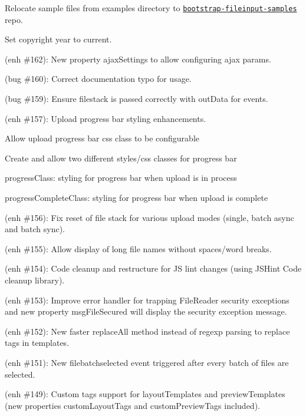 \begin{DoxyItemize}
\item Relocate sample files from examples directory to \href{https://github.com/kartik-v/bootstrap-fileinput-samples}{\tt bootstrap-\/fileinput-\/samples} repo.
\item Set copyright year to current.
\item (enh \#162)\+: New property ajax\+Settings to allow configuring ajax params.
\item (bug \#160)\+: Correct documentation typo for usage.
\item (bug \#159)\+: Ensure filestack is passed correctly with {\ttfamily out\+Data} for events.
\item (enh \#157)\+: Upload progress bar styling enhancements.
\begin{DoxyItemize}
\item Allow upload progress bar css class to be configurable
\item Create and allow two different styles/css classes for progress bar
\begin{DoxyItemize}
\item {\ttfamily progress\+Class}\+: styling for progress bar when upload is in process
\item {\ttfamily progress\+Complete\+Class}\+: styling for progress bar when upload is complete
\end{DoxyItemize}
\end{DoxyItemize}
\item (enh \#156)\+: Fix reset of file stack for various upload modes (single, batch async and batch sync).
\item (enh \#155)\+: Allow display of long file names without spaces/word breaks.
\item (enh \#154)\+: Code cleanup and restructure for JS lint changes (using J\+S\+Hint Code cleanup library).
\item (enh \#153)\+: Improve error handler for trapping File\+Reader security exceptions and new property {\ttfamily msg\+File\+Secured} will display the security exception message.
\item (enh \#152)\+: New faster {\ttfamily replace\+All} method instead of regexp parsing to replace tags in templates.
\item (enh \#151)\+: New {\ttfamily filebatchselected} event triggered after every batch of files are selected.
\item (enh \#149)\+: Custom tags support for layout\+Templates and preview\+Templates (new properties {\ttfamily custom\+Layout\+Tags} and {\ttfamily custom\+Preview\+Tags} included).
\end{DoxyItemize}

